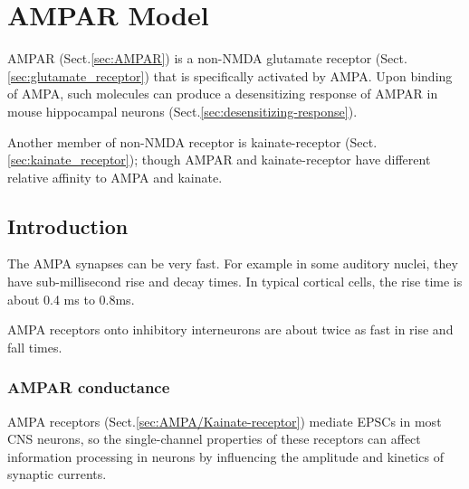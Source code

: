 \chapter{AMPAR Model}
\label{chap:AMPAR-models}

\def\decay{{\text{decay}}}
\def\rise{{\text{rise}}}
\def\AMPA{{\text{AMPA}}}
\def\post{{\text{post}}}


AMPAR (Sect.\ref{sec:AMPAR}) is a non-NMDA glutamate receptor
(Sect.\ref{sec:glutamate_receptor}) that is specifically activated by AMPA. Upon
binding of AMPA, such molecules can produce a desensitizing response of AMPAR in
mouse hippocampal neurons (Sect.\ref{sec:desensitizing-response}). 

Another member of non-NMDA receptor is kainate-receptor
(Sect.\ref{sec:kainate_receptor}); though AMPAR and kainate-receptor have
different relative affinity to AMPA and kainate.

\section{Introduction}
\label{sec:AMPAR-kinetics}

The  AMPA  synapses  can  be  very  fast.  For  example  in  some  auditory 
nuclei,  they  have  sub-millisecond  rise  and  decay  times.  In  typical 
cortical  cells,  the  rise  time is about 0.4 ms to 0.8ms. 

AMPA receptors onto inhibitory interneurons are about twice as fast in rise and
fall times.

\subsection{AMPAR conductance}
\label{sec:AMPAR-conductance}


AMPA receptors (Sect.\ref{sec:AMPA/Kainate-receptor}) mediate EPSCs in most CNS
neurons, so the single-channel properties of these receptors can affect
information processing in neurons by influencing the amplitude and kinetics of
synaptic currents.


